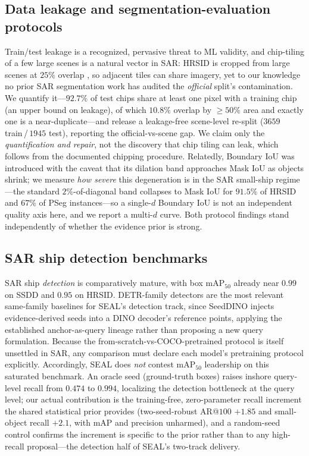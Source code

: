 \subsection{Data leakage and segmentation-evaluation protocols}
Train/test leakage is a recognized, pervasive threat to ML validity, and chip-tiling of a few large scenes is a natural vector in SAR: HRSID is cropped from large scenes at $25\%$ overlap \cite{wei2020hrsid}, so adjacent tiles can share imagery, yet to our knowledge no prior SAR segmentation work has audited the \emph{official} split's contamination. We quantify it---$92.7\%$ of test chips share at least one pixel with a training chip (an upper bound on leakage), of which $10.8\%$ overlap by $\ge\!50\%$ area and exactly one is a near-duplicate---and release a leakage-free scene-level re-split ($3659$ train\,/\,$1945$ test), reporting the official-vs-scene gap. We claim only the \emph{quantification and repair}, not the discovery that chip tiling can leak, which follows from the documented chipping procedure. Relatedly, Boundary IoU \cite{cheng2021boundary} was introduced with the caveat that its dilation band approaches Mask IoU as objects shrink; we measure \emph{how severe} this degeneration is in the SAR small-ship regime---the standard $2\%$-of-diagonal band collapses to Mask IoU for $91.5\%$ of HRSID and $67\%$ of PSeg instances---so a single-$d$ Boundary IoU is not an independent quality axis here, and we report a multi-$d$ curve. Both protocol findings stand independently of whether the evidence prior is strong.

\subsection{SAR ship detection benchmarks}
SAR ship \emph{detection} is comparatively mature, with box mAP$_{50}$ already near $0.99$ on SSDD and $0.95$ on HRSID. DETR-family detectors are the most relevant same-family baselines for SEAL's detection track, since SeedDINO injects evidence-derived seeds into a DINO \cite{zhang2023dino} decoder's reference points, applying the established anchor-as-query lineage rather than proposing a new query formulation. Because the from-scratch-vs-COCO-pretrained protocol is itself unsettled in SAR, any comparison must declare each model's pretraining protocol explicitly. Accordingly, SEAL does \emph{not} contest mAP$_{50}$ leadership on this saturated benchmark. An oracle seed (ground-truth boxes) raises inshore query-level recall from $0.474$ to $0.994$, localizing the detection bottleneck at the query level; our actual contribution is the training-free, zero-parameter recall increment the shared statistical prior provides (two-seed-robust AR@$100$ $+1.85$ and small-object recall $+2.1$, with mAP and precision unharmed), and a random-seed control confirms the increment is specific to the prior rather than to any high-recall proposal---the detection half of SEAL's two-track delivery.

